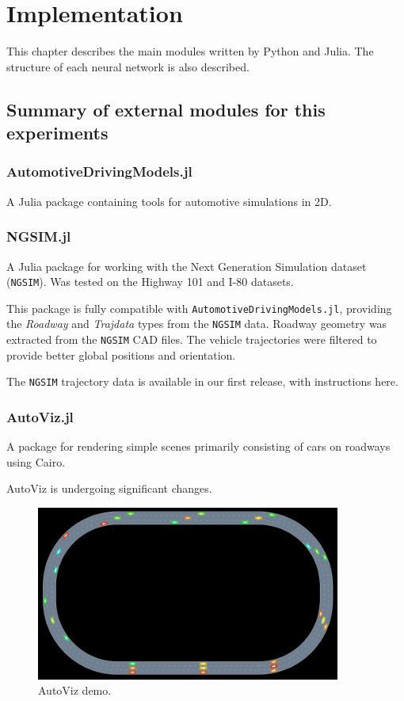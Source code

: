 \chapter{Implementation}
\label{chapter:Implementation}

This chapter describes the main modules written by Python and Julia.
The structure of each neural network is also described.


\section{Summary of external modules for this experiments}

\subsection{AutomotiveDrivingModels.jl}

A Julia package containing tools for automotive simulations in 2D.

\subsection{NGSIM.jl}

A Julia package for working with the Next Generation Simulation dataset ({\tt NGSIM}). Was tested on the Highway 101 and I-80 datasets.

This package is fully compatible with {\tt AutomotiveDrivingModels.jl}, providing the {\it Roadway} and {\it Trajdata} types from the {\tt NGSIM} data. Roadway geometry was extracted from the {\tt NGSIM} CAD files. The vehicle trajectories were filtered to provide better global positions and orientation.

The {\tt NGSIM} trajectory data is available in our first release, with instructions here.

\subsection{AutoViz.jl}

A package for rendering simple scenes primarily consisting of cars on roadways using Cairo.

AutoViz is undergoing significant changes.

\begin{figure}[H]
\begin{center}
\includegraphics[width=10cm]{./figures/readmeimage.png}
\caption{AutoViz demo.}
\label{fig:example_autoviz_demo}
\end{center}
\end{figure}



